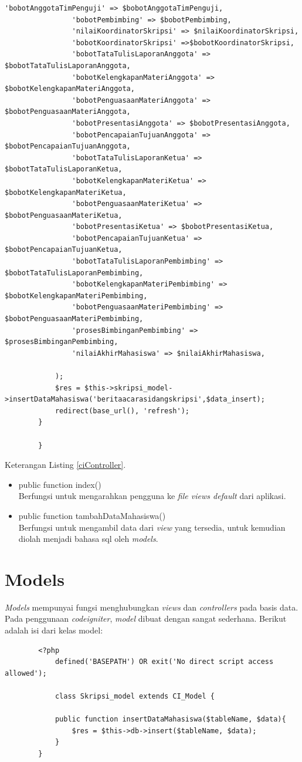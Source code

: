 \begin{lstlisting}[caption= File Controller, label= ciController]
				'bobotAnggotaTimPenguji' => $bobotAnggotaTimPenguji,
				'bobotPembimbing' => $bobotPembimbing,
				'nilaiKoordinatorSkripsi' => $nilaiKoordinatorSkripsi,
				'bobotKoordinatorSkripsi' =>$bobotKoordinatorSkripsi,
				'bobotTataTulisLaporanAnggota' => $bobotTataTulisLaporanAnggota,
				'bobotKelengkapanMateriAnggota' => $bobotKelengkapanMateriAnggota,
				'bobotPenguasaanMateriAnggota' => $bobotPenguasaanMateriAnggota,
				'bobotPresentasiAnggota' => $bobotPresentasiAnggota,
				'bobotPencapaianTujuanAnggota' => $bobotPencapaianTujuanAnggota,
				'bobotTataTulisLaporanKetua' => $bobotTataTulisLaporanKetua,
				'bobotKelengkapanMateriKetua' => $bobotKelengkapanMateriKetua,
				'bobotPenguasaanMateriKetua' => $bobotPenguasaanMateriKetua,
				'bobotPresentasiKetua' => $bobotPresentasiKetua,
				'bobotPencapaianTujuanKetua' => $bobotPencapaianTujuanKetua,
				'bobotTataTulisLaporanPembimbing' => $bobotTataTulisLaporanPembimbing,
				'bobotKelengkapanMateriPembimbing' => $bobotKelengkapanMateriPembimbing,
				'bobotPenguasaanMateriPembimbing' => $bobotPenguasaanMateriPembimbing,
				'prosesBimbinganPembimbing' => $prosesBimbinganPembimbing,
				'nilaiAkhirMahasiswa' => $nilaiAkhirMahasiswa,
		
			);
			$res = $this->skripsi_model->insertDataMahasiswa('beritaacarasidangskripsi',$data_insert);
			redirect(base_url(), 'refresh');
		}
		
		}
	\end{lstlisting}
	
	Keterangan Listing \ref{ciController}.
	\begin{itemize}
		\item public function index()\\
		Berfungsi untuk mengarahkan pengguna ke \textit{file views default} dari aplikasi.
		\item public function tambahDataMahasiswa()\\
		Berfungsi untuk mengambil data dari \textit{view} yang tersedia, untuk kemudian diolah menjadi bahasa sql oleh \textit{models}.
	\end{itemize}
	
	\section{Models}
	\label{sec: models}
	
	\textit{Models} mempunyai fungsi menghubungkan \textit{views} dan \textit{controllers} pada basis data. Pada penggunaan \textit{codeigniter}, \textit{model} dibuat dengan sangat sederhana. Berikut adalah isi dari kelas model:
	\begin{lstlisting}
		<?php
			defined('BASEPATH') OR exit('No direct script access allowed');
			
			class Skripsi_model extends CI_Model {
			
			public function insertDataMahasiswa($tableName, $data){
				$res = $this->db->insert($tableName, $data);
			}
		}
		
	\end{lstlisting}
	
